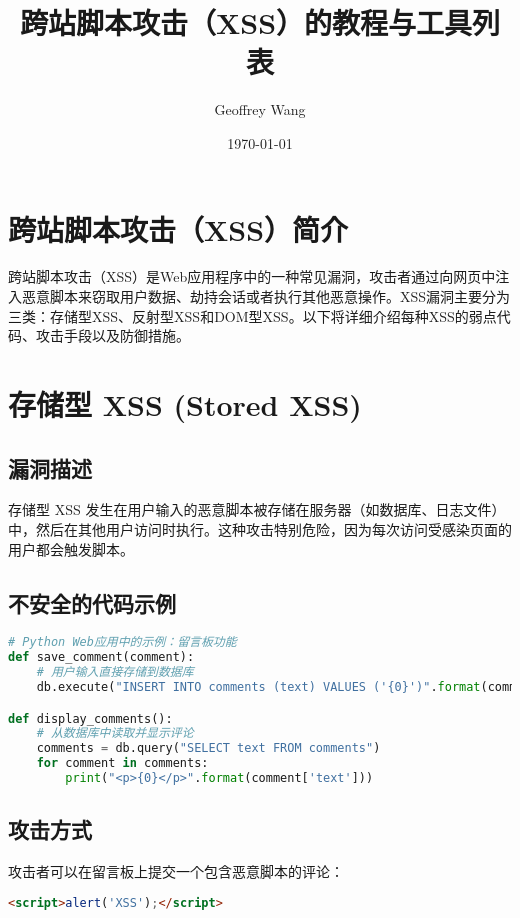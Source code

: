 \documentclass{article}
\title{跨站脚本攻击（XSS）的教程与工具列表}
\author{Geoffrey Wang}
\date{\today}
\begin{document}
\maketitle

\section{跨站脚本攻击（XSS）简介}

跨站脚本攻击（XSS）是Web应用程序中的一种常见漏洞，攻击者通过向网页中注入恶意脚本来窃取用户数据、劫持会话或者执行其他恶意操作。XSS漏洞主要分为三类：存储型XSS、反射型XSS和DOM型XSS。以下将详细介绍每种XSS的弱点代码、攻击手段以及防御措施。

\section{存储型 XSS (Stored XSS)}

\subsection{漏洞描述}
存储型 XSS 发生在用户输入的恶意脚本被存储在服务器（如数据库、日志文件）中，然后在其他用户访问时执行。这种攻击特别危险，因为每次访问受感染页面的用户都会触发脚本。

\subsection{不安全的代码示例}

\begin{lstlisting}[language=Python, caption=存储型 XSS 的不安全代码示例]
# Python Web应用中的示例：留言板功能
def save_comment(comment):
    # 用户输入直接存储到数据库
    db.execute("INSERT INTO comments (text) VALUES ('{0}')".format(comment))

def display_comments():
    # 从数据库中读取并显示评论
    comments = db.query("SELECT text FROM comments")
    for comment in comments:
        print("<p>{0}</p>".format(comment['text']))
\end{lstlisting}

\subsection{攻击方式}
攻击者可以在留言板上提交一个包含恶意脚本的评论：

\begin{lstlisting}[language=HTML, caption=恶意脚本]
<script>alert('XSS');</script>
\end{lstlisting}
\end{document}
